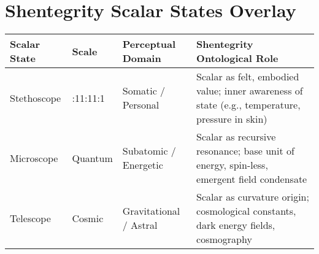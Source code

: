\documentclass{article}
\begin{document}
\section*{Shentegrity Scalar States Overlay}

\small
{}

\begin{longtable}{|>{\raggedright\arraybackslash}p{3cm}|>{\raggedright\arraybackslash}p{3.2cm}|>{\raggedright\arraybackslash}p{4cm}|>{\raggedright\arraybackslash}p{6cm}|}
\hline
\rowcolor{black!20}
\textbf{Scalar State} & \textbf{Scale} & \textbf{Perceptual Domain} & \textbf{Shentegrity Ontological Role} \\
\hline
Stethoscope & 1:11{:}11:1 & Somatic / Personal & Scalar as felt, embodied value; inner awareness of state (e.g., temperature, pressure in skin) \\
Microscope & Quantum & Subatomic / Energetic & Scalar as recursive resonance; base unit of energy, spin-less, emergent field condensate \\
Telescope & Cosmic & Gravitational / Astral & Scalar as curvature origin; cosmological constants, dark energy fields, cosmography \\
\hline
\end{longtable}
\end{document}
